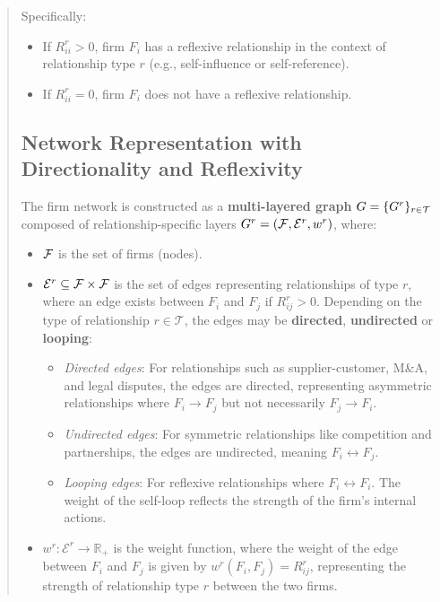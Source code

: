 \begin{quote}
Specifically:
\begin{itemize}
  \item If $R_{i i}^r>0$, firm $F_i$ has a reflexive relationship in the context of relationship type $r$ (e.g., self-influence or self-reference).
  \item If $R_{i i}^r=0$, firm $F_i$ does not have a reflexive relationship.

\end{itemize}


\subsection{Network Representation with Directionality and Reflexivity}

The firm network is constructed as a \textbf{multi-layered graph} $G=\{G^r\}_{r\in\mathcal{T}}$
composed of relationship-specific layers $G^r=\left(\mathcal{F}, \mathcal{E}^r, w^r\right)$, where:
\begin{itemize}
  \item $\mathcal{F}$ is the set of firms (nodes).
  \item $\mathcal{E}^r \subseteq \mathcal{F} \times \mathcal{F}$ is the set of edges representing relationships of type $r$, where an edge exists between $F_i$ and $F_j$ if $R_{i j}^r>0$. Depending on the type of relationship $r \in \mathcal{T}$, the edges may be \textbf{directed}, \textbf{undirected} or \textbf{looping}:
\begin{itemize}
    \item \textit{Directed edges}: For relationships such as supplier-customer, M\&A, and legal disputes, the edges are directed, representing asymmetric relationships where $ F_i \to F_j $ but not necessarily $ F_j \to F_i $.
    \item \textit{Undirected edges}: For symmetric relationships like competition and partnerships, the edges are undirected, meaning $ F_i \leftrightarrow F_j $.
    \item \textit{Looping edges}: For reflexive relationships where $F_i\leftrightarrow F_i$. The weight of the self-loop reflects the strength of the firm's internal actions.
\end{itemize}
  \item $w^r: \mathcal{E}^r \rightarrow \mathbb{R}_{+}$ is the weight function, where the weight of the edge between $F_i$ and $F_j$ is given by $w^r\left(F_i, F_j\right)=R_{i j}^r$, representing the strength of relationship type $r$ between the two firms.
\end{itemize}


\end{quote}
